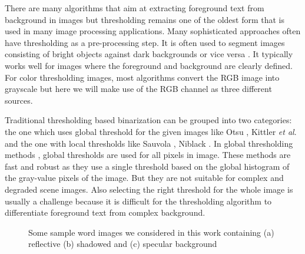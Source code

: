 There are many algorithms that aim at extracting foreground text from background in images but thresholding remains one of
the oldest form that is used in many image processing applications. Many sophisticated approaches often have thresholding as a pre-processing step. 
It is often used to segment images consisting of bright objects against dark backgrounds or vice versa \cite{A1,A3,A4}.
It typically works well for images where the foreground and background are clearly defined.
For color thresholding images, most algorithms convert the 
RGB image into grayscale but here we will make use of the RGB channel as three different sources. 

Traditional thresholding based binarization can be grouped into two categories: the one which uses global
threshold for the given images like Otsu \cite{A2}, Kittler {\em et al}. 
\cite{A5} and the one with local thresholds like Sauvola \cite{A6},
Niblack \cite{A9}. In global thresholding methods \cite{A2,A7}, global thresholds are
used for all pixels in image. These methods are fast and robust as
they use a single threshold based on the global histogram of the gray-value pixels of the image.
But they are not suitable for complex
and degraded scene images. 
Also selecting the right threshold for the whole image is usually a challenge 
because it is difficult for the thresholding
algorithm to differentiate foreground text from complex background.
\begin{figure}[t]
\centering
{}
\caption
{Some sample word images we considered in this work containing (a) reflective (b) shadowed and (c) specular background}
\label{fig:1}
\end{figure}
